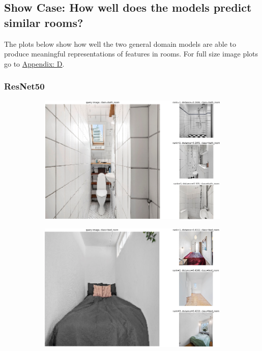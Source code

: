 \subsection{Show Case: How well does the models predict similar rooms?}
The plots below show how well the two general domain models are able to produce meaningful representations of features in rooms. For full size image plots go to \hyperref[appendix: D]{Appendix: D}.
\subsubsection{ResNet50}
\begin{figure}[H]
    \centering
    \begin{subfigure}[b]{0.45\textwidth}
      \centering
      \includegraphics[width=\textwidth]{pictures/random/resnet50bathroomplot}
      \label{fig:1}
    \end{subfigure}
    \hfill
    \begin{subfigure}[b]{0.45\textwidth}
      \centering
      \includegraphics[width=\textwidth]{pictures/random/resnet50bedroomplot}

\end{subfigure}
\end{figure}
